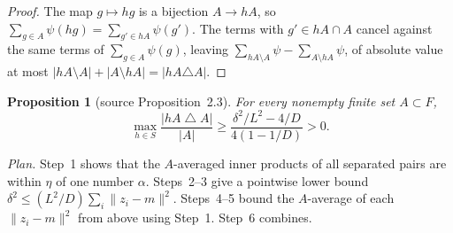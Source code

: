 \documentclass[11pt]{article}
\newcommand{\norm}[1]{\lVert #1\rVert}
\newtheorem{proposition}[theorem]{Proposition}
\theoremstyle{definition}
\numberwithin{equation}{section}
\begin{document}
\begin{proof}
The map \(g\mapsto hg\) is a bijection \(A\to hA\), so
\(\sum_{g\in A}\psi(hg)=\sum_{g'\in hA}\psi(g')\). The terms with
\(g'\in hA\cap A\) cancel against the same terms of
\(\sum_{g\in A}\psi(g)\), leaving
\(\sum_{hA\setminus A}\psi-\sum_{A\setminus hA}\psi\), of absolute value
at most \(|hA\setminus A|+|A\setminus hA|=|hA\triangle A|\).
\end{proof}

\begin{proposition}[source Proposition~2.3]\label{avg:boundary}
For every nonempty finite set \(A\subset F\),
\begin{equation}\label{avg:boundary-bound}
  \max_{h\in S}\frac{|hA\mathbin{\triangle}A|}{|A|}
  \ge \frac{\delta^2/L^2-4/D}{4(1-1/D)}>0 .
\end{equation}
\end{proposition}

\noindent\emph{Plan.} Step~1 shows that the \(A\)-averaged inner products
of all separated pairs are within \(\eta\) of one number \(\alpha\).
Steps~2--3 give a pointwise lower bound \(\delta^2\le
(L^2/D)\sum_i\norm{z_i-m}^2\). Steps~4--5 bound the \(A\)-average of each
\(\norm{z_i-m}^2\) from above using Step~1. Step~6 combines.
\end{document}
